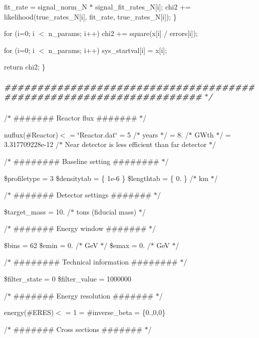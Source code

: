 fit\+\_\+rate = signal\+\_\+norm\+\_\+N $\ast$ signal\+\_\+fit\+\_\+rates\+\_\+N\mbox{[}i\mbox{]}; chi2 += likelihood(true\+\_\+rates\+\_\+\+N\mbox{[}i\mbox{]}, fit\+\_\+rate, true\+\_\+rates\+\_\+\+N\mbox{[}i\mbox{]}); \}

for (i=0; i $<$ n\+\_\+params; i++) chi2 += square(x\mbox{[}i\mbox{]} / errors\mbox{[}i\mbox{]});

for (i=0; i $<$ n\+\_\+params; i++) sys\+\_\+startval\mbox{[}i\mbox{]} = x\mbox{[}i\mbox{]};

return chi2; \}

\subparagraph*{\#\#\#\#\#\#\#\#\#\#\#\#\#\#\#\#\#\#\#\#\#\#\#\#\#\#\#\#\#\#\#\#\#\#\#\#\#\#\#\#\#\#\#\#\#\#\#\#\#\#\#\#\#\#\#\#\#\#\#\#\#\#\#\#\#\#\#\# $\ast$/}

/$\ast$ \#\#\#\#\#\#\# Reactor flux \#\#\#\#\#\#\# $\ast$/

nuflux(\#\+Reactor)$<$  = \char`\"{}\+Reactor.\+dat\char`\"{}  = 5 /$\ast$ years $\ast$/  = 8. /$\ast$ G\+Wth $\ast$/  = 3.\+317709228e-\/12 /$\ast$ Near detector is less efficient than far detector $\ast$/ \begin{quote}


\end{quote}


/$\ast$ \#\#\#\#\#\#\#\# Baseline setting \#\#\#\#\#\#\#\# $\ast$/

\$profiletype = 3 \$densitytab = \{ 1e-\/6 \} \$lengthtab = \{ 0. \} /$\ast$ km $\ast$/

/$\ast$ \#\#\#\#\#\#\# Detector settings \#\#\#\#\#\#\# $\ast$/

\$target\+\_\+mass = 10. /$\ast$ tons (fiducial mass) $\ast$/

/$\ast$ \#\#\#\#\#\#\# Energy window \#\#\#\#\#\#\# $\ast$/

\$bins = 62 \$emin = 0. /$\ast$ GeV $\ast$/ \$emax = 0. /$\ast$ GeV $\ast$/

/$\ast$ \#\#\#\#\#\#\#\# Technical information \#\#\#\#\#\#\#\# $\ast$/

\$filter\+\_\+state = 0 \$filter\+\_\+value = 1000000

/$\ast$ \#\#\#\#\#\#\# Energy resolution \#\#\#\#\#\#\# $\ast$/

energy(\#\+E\+R\+ES)$<$  = 1  = \#inverse\+\_\+beta  = \{0.,0,0\} \begin{quote}


\end{quote}


/$\ast$ \#\#\#\#\#\#\# Cross sections \#\#\#\#\#\#\# $\ast$/

